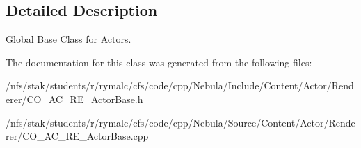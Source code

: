 \subsection{Detailed Description}
Global Base Class for Actors. 

The documentation for this class was generated from the following files:\begin{DoxyCompactItemize}
\item 
/nfs/stak/students/r/rymalc/cfs/code/cpp/Nebula/Include/Content/Actor/Renderer/CO\_\-AC\_\-RE\_\-ActorBase.h\item 
/nfs/stak/students/r/rymalc/cfs/code/cpp/Nebula/Source/Content/Actor/Renderer/CO\_\-AC\_\-RE\_\-ActorBase.cpp\end{DoxyCompactItemize}
